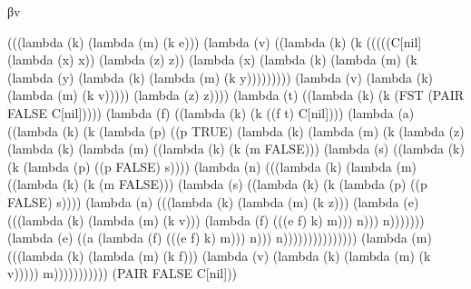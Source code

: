 \documentclass[ms,electronic,twosidetoc,letterpaper,chaptercenter,parttop]{byumsphd}
\begin{document}
\begin{theorem}
βv
\begin{schemedisplay}
(((lambda (k) (lambda (m) (k e)))
  (lambda (v) ((lambda (k) (k (((((C[nil] (lambda (x) x)) (lambda (z) z))
                     (lambda (x) (lambda (k) (lambda (m) (k (lambda (y) (lambda (k) (lambda (m) (k y)))))))))
                    (lambda (v) (lambda (k) (lambda (m) (k v))))) (lambda (z) z))))
         (lambda (t) ((lambda (k) (k (FST
                          (PAIR FALSE C[nil]))))
                (lambda (f) ((lambda (k) (k ((f t) C[nil])))
                       (lambda (a) ((lambda (k) (k (lambda (p) ((p TRUE)
                                              (lambda (k) (lambda (m) (k (lambda (z) (lambda (k) (lambda (m) ((lambda (k) (k (m FALSE)))
                                                                                (lambda (s) ((lambda (k) (k (lambda (p) ((p FALSE) s))))
                                                                                       (lambda (n) (((lambda (k) (lambda (m) ((lambda (k) (k (m FALSE)))
                                                                                                            (lambda (s) ((lambda (k) (k (lambda (p) ((p FALSE) s))))
                                                                                                                   (lambda (n) (((lambda (k) (lambda (m) (k z)))
                                                                                                                           (lambda (e) (((lambda (k) (lambda (m) (k v)))
                                                                                                                                   (lambda (f) (((e f) k) m))) n))) n)))))))
                                                                                               (lambda (e) ((a (lambda (f) (((e f) k) m))) n))) n)))))))))))))))
                              (lambda (m) (((lambda (k) (lambda (m) (k f)))
                                      (lambda (v) (lambda (k) (lambda (m) (k v))))) m)))))))))))
 (PAIR FALSE C[nil]))
\end{schemedisplay}


\end{theorem}
\end{document}
